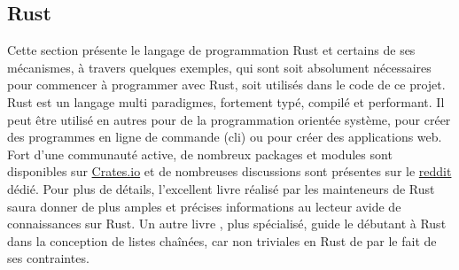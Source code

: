 \subsection{Rust}
Cette section présente le langage de programmation Rust et certains de ses mécanismes, à 
travers quelques exemples, qui sont soit absolument nécessaires pour commencer à programmer avec 
Rust, soit utilisés dans le code de ce projet. Rust est un langage multi paradigmes, fortement typé, 
compilé et performant. Il peut être utilisé en autres pour de la programmation orientée système, 
pour créer des programmes en ligne de commande (\acrshort{cli}) ou pour créer des applications web. 
Fort d'une communauté active, de 
nombreux packages et modules sont disponibles sur \href{https://crates.io}{Crates.io} \cite{ref33} 
et de nombreuses discussions sont présentes sur le \href{https://www.reddit.com/r/rust/}{reddit} 
\cite{ref34} dédié. Pour plus de détails, l'excellent livre \cite{ref0} réalisé par les mainteneurs 
de Rust saura donner de plus amples et précises informations au lecteur avide de connaissances sur 
Rust. Un autre livre \cite{ref2}, plus spécialisé, guide le débutant à Rust dans la conception de 
listes chaînées, car non triviales en Rust de par le fait de ses contraintes.

